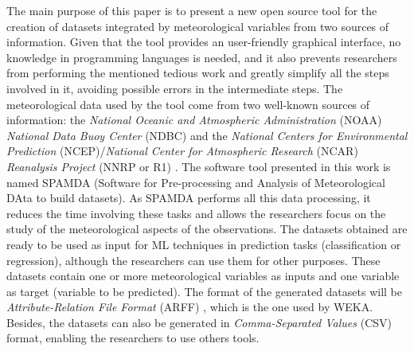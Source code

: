 \documentclass[review]{elsarticle}
\begin{document}
		The main purpose of this paper is to present a new open source tool for the creation of datasets integrated by meteorological variables from two sources of information. Given that the tool provides an user-friendly graphical interface, no knowledge in programming languages is needed, and it also prevents researchers from performing the mentioned tedious work and greatly simplify all the steps involved in it, avoiding possible errors in the intermediate steps. The meteorological data used by the tool come from two well-known sources of information: the \textit{National Oceanic and Atmospheric Administration} (NOAA) \textit{National Data Buoy Center} (NDBC) \cite{NOAA} and the \textit{National Centers for Environmental Prediction} (NCEP)/\textit{National Center for Atmospheric Research} (NCAR) \textit{Reanalysis Project} (NNRP or R1) \cite{Kalnay1996, Kistler2001}. The software tool presented in this work is named SPAMDA (Software for Pre-processing and Analysis of Meteorological DAta to build datasets). As SPAMDA performs all this data processing, it reduces the time involving these tasks and allows the researchers focus on the study of the meteorological aspects of the observations. The datasets obtained are ready to be used as input for ML techniques in prediction tasks (classification or regression), although the researchers can use them for other purposes. These datasets contain one or more meteorological variables as inputs and one variable as target (variable to be predicted). The format of the generated datasets will be \textit{Attribute-Relation File Format} (ARFF) \cite{WEKA_ARFF}, which is the one used by WEKA. Besides, the datasets can also be generated in \textit{Comma-Separated Values} (CSV) format, enabling the researchers to use others tools.
\end{document}
